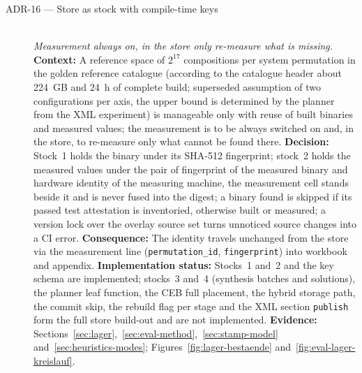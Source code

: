 \begin{description}
  \item[ADR-16 --- Store as stock with compile-time keys]\hfill\\
  \emph{Measurement always on, in the store only re-measure what is missing.}\hfill\\
  \textbf{Context:} A reference space of $2^{17}$ compositions per system permutation in the golden reference catalogue
  (according to the catalogue header about 224~GB and 24~h of complete build; superseded assumption of two
  configurations per axis, the upper bound is determined by the planner from the XML experiment) is
  manageable only with reuse of
  built binaries and measured values; the measurement is to be always switched on and, in the
  store, to re-measure only what cannot be found there.
  \textbf{Decision:} Stock~1 holds the binary under its SHA-512 fingerprint; stock~2 holds the
  measured values under the pair of fingerprint of the measured binary and hardware identity of the
  measuring machine, the measurement cell stands beside it and is never fused into the digest; a
  binary found is skipped if its passed test attestation is inventoried, otherwise built or
  measured; a version lock over the overlay source set turns unnoticed source changes into a CI
  error.
  \textbf{Consequence:} The identity travels unchanged from the store via the measurement line
  (\texttt{permutation\_id}, \texttt{fingerprint}) into workbook and appendix.
  \textbf{Implementation status:} Stocks~1 and~2 and the key schema are implemented; stocks~3
  and~4 (synthesis batches and solutions), the planner leaf function, the CEB full placement, the
  hybrid storage path, the commit skip, the rebuild flag per stage and the XML section
  \texttt{publish} form the full store build-out and are not implemented.
  \textbf{Evidence:} Sections~\ref{sec:lager},~\ref{sec:eval-method},~\ref{sec:stamp-model}
  and~\ref{sec:heuristics-modes}; Figures~\ref{fig:lager-bestaende}
  and~\ref{fig:eval-lager-kreislauf}.


\end{description}
